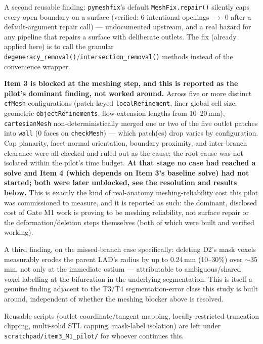 \documentclass[11pt]{article}
\begin{document}
A second reusable finding: \texttt{pymeshfix}'s default \texttt{MeshFix.repair()} silently caps every
open boundary on a surface (verified: 6 intentional openings $\to$ 0 after a default-argument repair
call) --- undocumented upstream, and a real hazard for any pipeline that repairs a surface with
deliberate outlets. The fix (already applied here) is to call the granular
\texttt{degeneracy\_\allowbreak{}removal()}/\texttt{intersection\_\allowbreak{}removal()} methods instead of the convenience
wrapper.

\textbf{Item 3 is blocked at the meshing step, and this is reported as the pilot's dominant finding, not
worked around.} Across five or more distinct \texttt{cfMesh} configurations (patch-keyed
\texttt{localRefinement}, finer global cell size, geometric \texttt{objectRefinements}, flow-extension
lengths from 10--20\,mm), \texttt{cartesianMesh} non-deterministically merged one or two of the five
outlet patches into \texttt{wall} (0 faces on \texttt{checkMesh}) --- which patch(es) drop varies by
configuration. Cap planarity, facet-normal orientation, boundary proximity, and inter-branch clearance
were all checked and ruled out as the cause; the root cause was not isolated within the pilot's time
budget. \textbf{At that stage no case had reached a solve and Item 4 (which depends on Item 3's baseline solve) had
not started; both were later unblocked, see the resolution and results below.} This is exactly the kind of real-anatomy meshing-reliability cost this
pilot was commissioned to measure, and it is reported as such: the dominant, disclosed cost of Gate M1
work is proving to be meshing reliability, not surface repair or the deformation/deletion steps
themselves (both of which were built and verified working).

A third finding, on the missed-branch case specifically: deleting D2's mask voxels measurably erodes
the parent LAD's radius by up to 0.24\,mm (10--30\%) over $\sim$35\,mm, not only at the immediate
ostium --- attributable to ambiguous/shared voxel labelling at the bifurcation in the underlying
segmentation. This is itself a genuine finding adjacent to the T3/T4 segmentation-error class this study
is built around, independent of whether the meshing blocker above is resolved.

Reusable scripts (outlet coordinate/tangent mapping, locally-restricted truncation clipping, multi-solid
STL capping, mask-label isolation) are left under \texttt{scratchpad/\allowbreak{}item3\_\allowbreak{}M1\_\allowbreak{}pilot/\allowbreak{}} for whoever
continues this.
\end{document}
